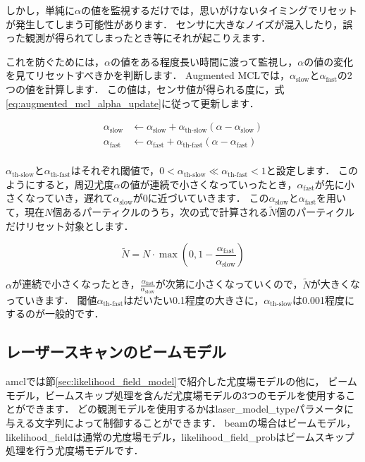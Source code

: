 \documentclass[{../../master}]{subfiles}
\begin{document}
しかし，単純に$\alpha$の値を監視するだけでは，思いがけないタイミングでリセットが発生してしまう可能性があります．
センサに大きなノイズが混入したり，誤った観測が得られてしまったとき等にそれが起こりえます．

これを防ぐためには，$\alpha$の値をある程度長い時間に渡って監視し，$\alpha$の値の変化を見てリセットすべきかを判断します．
Augmented MCLでは，$\alpha_{\text{slow}}$と$\alpha_{\text{fast}}$の2つの値を計算します．
この値は，センサ値が得られる度に，式\ref{eq:augmented_mcl_alpha_update}に従って更新します．

\begin{equation}
  \begin{split}
    \alpha_{\text{slow}} &\leftarrow \alpha_{\text{slow}} + \alpha_{\text{th-slow}}(\alpha - \alpha_{\text{slow}}) \\
    \alpha_{\text{fast}} &\leftarrow \alpha_{\text{fast}} + \alpha_{\text{th-fast}}(\alpha - \alpha_{\text{fast}}) \\
  \end{split}
  \label{eq:augmented_mcl_alpha_update}
\end{equation}

$\alpha_{\text{th-slow}}$と$\alpha_{\text{th-fast}}$はそれぞれ閾値で，$0 < \alpha_{\text{th-slow}} \ll \alpha_{\text{th-fast}} < 1$と設定します．
このようにすると，周辺尤度$\alpha$の値が連続で小さくなっていったとき，$\alpha_{\text{fast}}$が先に小さくなっていき，遅れて$\alpha_{\text{slow}}$が0に近づいていきます．
この$\alpha_{\text{slow}}$と$\alpha_{\text{fast}}$を用いて，現在$N$個あるパーティクルのうち，次の式で計算される$\tilde{N}$個のパーティクルだけリセット対象とします．

\begin{equation}
  \tilde{N} = N \cdot \max \left(0, 1 - \frac{\alpha_{\text{fast}}}{\alpha_{\text{slow}}}\right)
\end{equation}

$\alpha$が連続で小さくなったとき，$\frac{\alpha_{\text{fast}}}{\alpha_{\text{slow}}}$が次第に小さくなっていくので，$\tilde{N}$が大きくなっていきます．
閾値$\alpha_{\text{th-fast}}$はだいたい0.1程度の大きさに，$\alpha_{\text{th-slow}}$は0.001程度にするのが一般的です．

\subsection{レーザースキャンのビームモデル}

\textsf{amcl}では節\ref{sec:likelihood_field_model}で紹介した尤度場モデルの他に，
ビームモデル\cite{thrun2005probabilistic}，ビームスキップ処理を含んだ尤度場モデルの3つのモデルを使用することができます．
どの観測モデルを使用するかは\textsf{laser\_model\_type}パラメータに与える文字列によって制御することができます．
\textsf{beam}の場合はビームモデル，{likelihood\_field}は通常の尤度場モデル，\textsf{likelihood\_field\_prob}はビームスキップ処理を行う尤度場モデルです．
\end{document}
